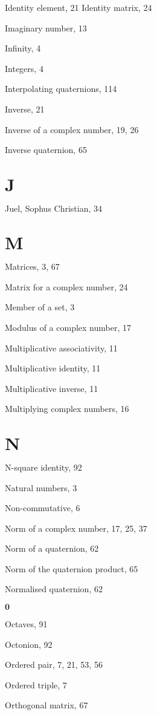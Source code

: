   Identity element, 21 Identity matrix, 24
  
  Imaginary number, 13
  
  Infinity, 4
  
  Integers, 4
  
  Interpolating quaternions, 114
  
  Inverse, 21
  
  Inverse of a complex number, 19, 26
  
  Inverse quaternion, 65
  
  \section{$\mathbf{J}$}
  Juel, Sophus Christian, 34
  
  \section{$\mathbf{M}$}
  Matrices, 3, 67
  
  Matrix for a complex number, 24
  
  Member of a set, 3
  
  Modulus of a complex number, 17
  
  Multiplicative associativity, 11
  
  Multiplicative identity, 11
  
  Multiplicative inverse, 11
  
  Multiplying complex numbers, 16
  
  \section{$\mathbf{N}$}
  $\mathrm{N}$-square identity, 92
  
  Natural numbers, 3
  
  Non-commutative, 6
  
  Norm of a complex number, 17, 25, 37
  
  Norm of a quaternion, 62
  
  Norm of the quaternion product, 65
  
  Normalised quaternion, 62
  
  $\mathbf{0}$
  
  Octaves, 91
  
  Octonion, 92
  
  Ordered pair, 7, 21, 53, 56
  
  Ordered triple, 7
  
  Orthogonal matrix, 67
  
